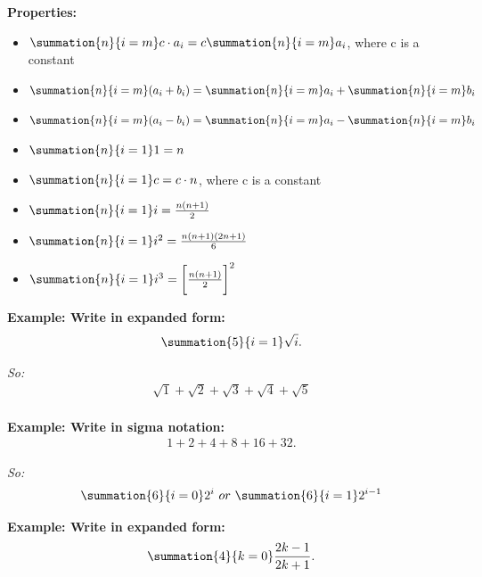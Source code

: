 \documentclass{report}
\begin{document}
\bigbreak \noindent 
{}

\bigbreak \noindent 
\begin{mdframed}
  \textbf{Properties:}
  \bigbreak \noindent 
  \begin{itemize}
    \item $\summation{n}{i=m}c \cdot a_i = c\summation{n}{i=m} a_{i}$, where c is a constant
    \item $\summation{n}{i=m} (a_{i} + b_{i})= \summation{n}{i=m} a_{i} + \summation{n}{i=m} b_{i} $
    \item $\summation{n}{i=m} (a_{i} - b_{i})= \summation{n}{i=m} a_{i} - \summation{n}{i=m} b_{i} $
    \item $\summation{n}{i=1} 1=n $
    \item $\summation{n}{i=1} c=c \cdot n $, where c is a constant
    \item $\summation{n}{i=1} i= \frac{n(n+1)}{2} $
    \item $\summation{n}{i=1}i^{2} = \frac{n(n+1)(2n+1)}{6} $
    \item $\summation{n}{i=1}i^{3}=\bigg[\frac{n(n+1)}{2}\bigg]^{2} $
  \end{itemize}
\end{mdframed}

\pagebreak \bigbreak \noindent
\begin{mdframed}
  \textbf{Example: Write in expanded form:}
  \begin{align*}
    \summation{5}{i=1}\sqrt{i}
  .\end{align*}
\end{mdframed}
\bigbreak \noindent
\textit{So:}
\begin{align*}
  \sqrt{1} + \sqrt{2} + \sqrt{3} + \sqrt{4} + \sqrt{5} \\
\end{align*}

\bigbreak \noindent 
\begin{mdframed}
  \textbf{Example: Write in sigma notation:}
  \begin{align*}
    1 + 2 + 4 + 8 + 16 + 32   
  .\end{align*}
\end{mdframed}

\bigbreak \noindent
\textit{So:}
\begin{align*}
  \summation{6}{i=0}2^{i}\ or\ \summation{6}{i=1}2^{i-1}
\end{align*}

\bigbreak \noindent 
\begin{mdframed}
  \textbf{Example: Write in expanded form:}
  \begin{align*}
    \summation{4}{k=0}\frac{2k-1}{2k+1}
  .\end{align*} 
\end{mdframed}
\end{document}
